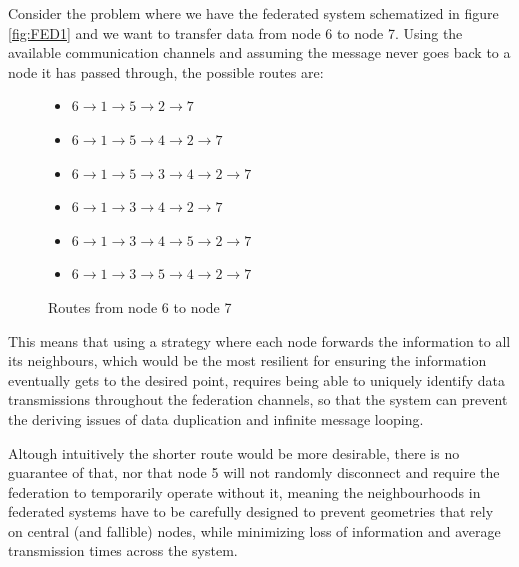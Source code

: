 \documentclass[journal]{IEEEtran}
\begin{document}
Consider the problem where we have the federated system schematized in figure \ref{fig:FED1} and we want to transfer data from node 6 to node 7. Using the available communication channels and assuming the message never goes back to a node it has passed through, the possible routes are:

\begin{figure}[h]

	\begin{itemize}
	
		\item $6 \rightarrow 1 \rightarrow 5 \rightarrow 2 \rightarrow 7$

		\item $6 \rightarrow 1 \rightarrow 5 \rightarrow 4 \rightarrow 2 \rightarrow 7$

		\item $6 \rightarrow 1 \rightarrow 5 \rightarrow 3 \rightarrow 4 \rightarrow 2 \rightarrow 7$

		\item $6 \rightarrow 1 \rightarrow 3 \rightarrow 4 \rightarrow 2 \rightarrow 7$

		\item $6 \rightarrow 1 \rightarrow 3 \rightarrow 4 \rightarrow 5 \rightarrow 2 \rightarrow 7$

		\item $6 \rightarrow 1 \rightarrow 3 \rightarrow 5 \rightarrow 4 \rightarrow 2 \rightarrow 7$

	\end{itemize}
	\caption{Routes from node 6 to node 7}
	\label{list:ROUTES1}

\end{figure}

This means that using a strategy where each node forwards the information to all its neighbours, which would be the most resilient for ensuring the information eventually gets to the desired point, requires being able to uniquely identify data transmissions throughout the federation channels, so that the system can prevent the deriving issues of data duplication and infinite message looping.

Altough intuitively the shorter route would be more desirable, there is no guarantee of that, nor that node 5 will not randomly disconnect and require the federation to temporarily operate without it, meaning the neighbourhoods in federated systems have to be carefully designed to prevent geometries that rely on central (and fallible) nodes, while minimizing loss of information and average transmission times across the system.
\end{document}
